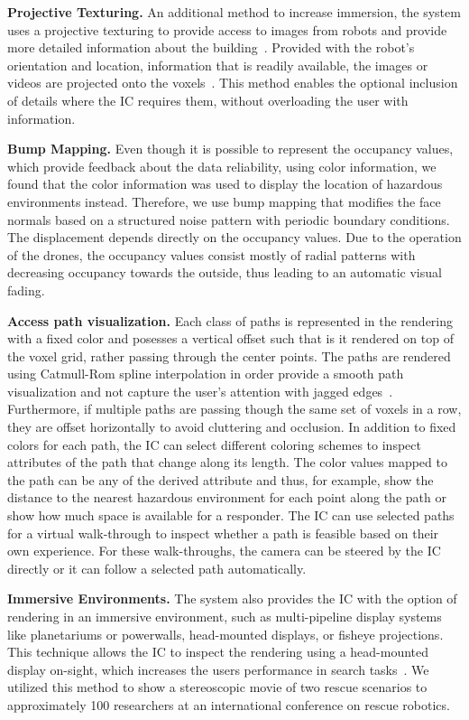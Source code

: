 \textbf{Projective Texturing. }  An additional method to increase immersion, the system uses a projective texturing to provide access to images from robots and provide more detailed information about the building~\cite{segal1992fast, everitt2001projective}.  Provided with the robot's orientation and location, information that is readily available, the images or videos are projected onto the voxels~\cite{zhao2005alignment}.  This method enables the optional inclusion of details where the IC requires them, without overloading the user with information.

\textbf{Bump Mapping. }  Even though it is possible to represent the occupancy values, which provide feedback about the data reliability, using color information, we found that the color information was used to display the location of hazardous environments instead.  Therefore, we use bump mapping that modifies the face normals based on a structured noise pattern with periodic boundary conditions.  The displacement depends directly on the occupancy values.  Due to the operation of the drones, the occupancy values consist mostly of radial patterns with decreasing occupancy towards the outside, thus leading to an automatic visual fading.

\textbf{Access path visualization. }  Each class of paths is represented in the  rendering with a fixed color and posesses a vertical offset such that is it rendered on top of the voxel grid, rather passing through the center points.  The paths are rendered using Catmull-Rom spline interpolation in order provide a smooth path visualization and not capture the user's attention with jagged edges~\cite{catmull1974class}.  Furthermore, if multiple paths are passing though the same set of voxels in a row, they are offset horizontally to avoid cluttering and occlusion.  In addition to fixed colors for each path, the IC can select different coloring schemes to inspect attributes of the path that change along its length.  The color values mapped to the path can be any of the derived attribute and thus, for example, show the distance to the nearest hazardous environment for each point along the path or show how much space is available for a responder.  The IC can use selected paths for a virtual walk-through to inspect whether a path is feasible based on their own experience.  For these walk-throughs, the camera can be steered by the IC directly or it can follow a selected path automatically.

\textbf{Immersive Environments. }  The system also provides the IC with the option of rendering in an immersive environment, such as multi-pipeline display systems like planetariums or powerwalls, head-mounted displays, or fisheye projections.  This technique allows the IC to inspect the rendering using a head-mounted display on-sight, which increases the users performance in search tasks~\cite{pausch1997quantifying}.  We utilized this method to show a stereoscopic movie of two rescue scenarios to approximately 100 researchers at an international conference on rescue robotics.

